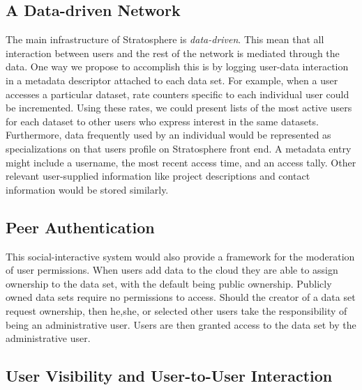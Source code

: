\begin{multicols*}{2}
\subsection{A Data-driven Network}

The main infrastructure of Stratosphere is \emph{data-driven}. This
mean that all interaction between users and the rest of the network is
mediated through the data. One way we propose to accomplish this is by logging
user-data interaction in a metadata descriptor attached to each data
set. For example, when a user accesses a particular dataset, 
rate counters specific to each individual user
could be incremented. Using these rates, we could present lists of the
most active users for each dataset to other users who express interest
in the same datasets. Furthermore, data frequently used by an
individual would be represented as specializations on that users
profile on Stratosphere front end. A metadata entry might 
include a username, the most recent access time, and an access tally. 
Other relevant user-supplied information like project descriptions 
and contact information would be stored similarly.



\subsection{Peer Authentication}

This social-interactive system would also provide a framework for
the moderation of user permissions.  When 
users add data to the cloud they are able to assign
ownership to the data set, with the default being public
ownership. Publicly owned data sets require no permissions to access.
Should the creator of a data set request ownership, then he,she, or
selected other users take the responsibility of being an
administrative user. Users are then granted access to the data set by
the administrative user.

\subsection{User Visibility and User-to-User Interaction}


\end{multicols*}
